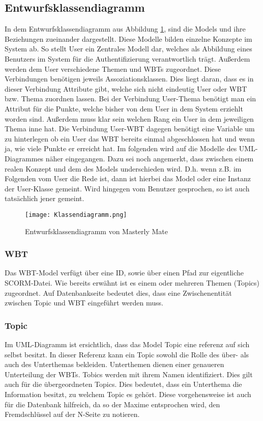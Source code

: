 \subsection{Entwurfsklassendiagramm}
In dem Entwurfsklassendiagramm aus Abbildung \ref{ref:picKlassendia}, sind die
Models und ihre Beziehungen zueinander dargestellt. Diese Modelle bilden
einzelne Konzepte im System ab. So stellt User ein Zentrales Modell dar, welches
als Abbildung eines Benutzers im System für die Authentifizierung verantwortlich
trägt. Außerdem werden dem User verschiedene Themen und WBTs zugeordnet. Diese
Verbindungen benötigen jeweils Assoziationsklassen. Dies liegt daran, dass es in
dieser Verbindung Attribute gibt, welche sich nicht eindeutig User oder WBT bzw.
Thema zuordnen lassen. Bei der Verbindung User-Thema benötigt man ein Attribut
für die Punkte, welche bisher von dem User in dem System erziehlt worden sind.
Außerdem muss klar sein welchen Rang ein User in dem jeweiligen Thema inne hat.
Die Verbindung User-WBT dagegen benötigt eine Variable um zu hinterlegen ob ein
User das WBT bereits einmal abgeschlossen hat und wenn ja, wie viele Punkte er
erreicht hat. Im folgenden wird auf die Modelle des UML-Diagrammes näher
eingegangen. Dazu sei noch angemerkt, dass zwischen einem realen Konzept und dem
des Models underschieden wird. D.h. wenn z.B. im Folgenden vom User die Rede
ist, dann ist hierbei das Model oder eine Instanz der User-Klasse gemeint. Wird
hingegen vom Benutzer gesprochen, so ist auch tatsächlich jener gemeint.

\begin{figure}[ht]
\centering
\texttt{[image: Klassendiagramm.png]}
\caption{Entwurfsklassendiagramm von Masterly Mate}\label{ref:picKlassendia}
\end{figure}

\subsubsection{WBT}\label{ref:objectWBT}
Das WBT-Model verfügt über eine ID, sowie über einen Pfad zur eigentliche
SCORM-Datei. Wie bereits erwähnt ist es einem oder mehreren Themen (Topics)
zugeordnet. Auf Datenbankseite bedeutet dies, dass eine Zwischenentität zwischen
Topic und WBT eingeführt werden muss. 

\subsubsection{Topic}
Im UML-Diagramm ist ersichtlich, dass das Model Topic eine referenz auf sich
selbst besitzt. In dieser Referenz kann ein Topic sowohl die Rolle des über- als
auch des Unterthemas bekleiden. Unterthemen dienen einer genaueren Unterteilung
der WBTs. Tobics werden mit ihrem Namen identifiziert. Dies gilt auch für die
übergeordneten Topics. Dies bedeutet, dass ein Unterthema die Information
besitzt, zu welchem Topic es gehört. Diese vorgehensweise ist auch für die
Datenbank hilfreich, da so der Maxime entsprochen wird, den Fremdschlüssel auf
der N-Seite zu notieren.

